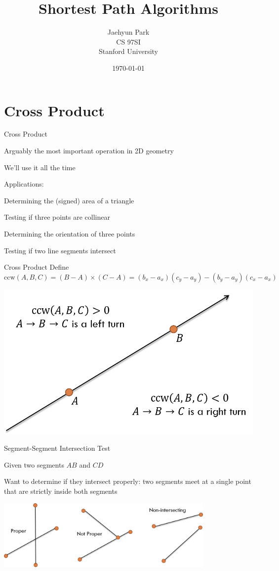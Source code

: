 \documentclass[13pt,onlymath]{beamer}
\title{\large \bfseries Shortest Path Algorithms}
\author{Jaehyun Park\\[3ex]
CS 97SI\\
Stanford University}
\date{\today}
\begin{document}
\frame{
\thispagestyle{empty}
\titlepage
}

\section{Cross Product}
\begin{frame}{Cross Product}
\BIT
\item Arguably the most important operation in 2D geometry
\item We'll use it all the time
\vfill
\item Applications:
\BIT
\item Determining the (signed) area of a triangle
\item Testing if three points are collinear
\item Determining the orientation of three points
\item Testing if two line segments intersect
\EIT \EIT
\end{frame}

\begin{frame}{Cross Product}
Define $\mathrm{ccw}(A, B, C) = (B-A) \times (C-A) = (b_x-a_x)(c_y-a_y)-(b_y-a_y)(c_x-a_x)$
\begin{center}
\includegraphics[height=0.5\textheight]{figures/ccw}
\end{center}
\end{frame}

\begin{frame}{Segment-Segment Intersection Test}
\BIT
\item Given two segments $AB$ and $CD$
\item Want to determine if they intersect properly: two segments meet at a single point that are strictly inside both segments
\EIT
\begin{center}
\includegraphics[width=0.8\textwidth]{figures/seg_intersection}
\end{center}
\end{frame}
\end{document}
